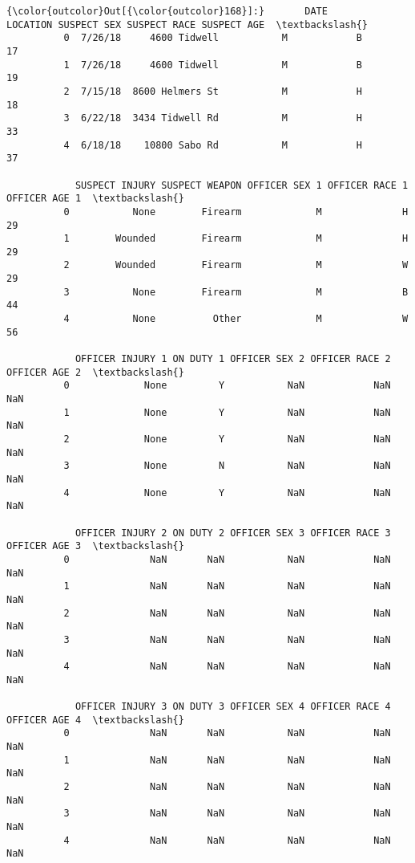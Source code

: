 \documentclass[11pt]{article}
\begin{document}
\begin{Verbatim}[commandchars=\\\{\}]
{\color{outcolor}Out[{\color{outcolor}168}]:}       DATE         LOCATION SUSPECT SEX SUSPECT RACE SUSPECT AGE  \textbackslash{}
          0  7/26/18     4600 Tidwell           M            B          17   
          1  7/26/18     4600 Tidwell           M            B          19   
          2  7/15/18  8600 Helmers St           M            H          18   
          3  6/22/18  3434 Tidwell Rd           M            H          33   
          4  6/18/18    10800 Sabo Rd           M            H          37   
          
            SUSPECT INJURY SUSPECT WEAPON OFFICER SEX 1 OFFICER RACE 1  OFFICER AGE 1  \textbackslash{}
          0           None        Firearm             M              H             29   
          1        Wounded        Firearm             M              H             29   
          2        Wounded        Firearm             M              W             29   
          3           None        Firearm             M              B             44   
          4           None          Other             M              W             56   
          
            OFFICER INJURY 1 ON DUTY 1 OFFICER SEX 2 OFFICER RACE 2  OFFICER AGE 2  \textbackslash{}
          0             None         Y           NaN            NaN            NaN   
          1             None         Y           NaN            NaN            NaN   
          2             None         Y           NaN            NaN            NaN   
          3             None         N           NaN            NaN            NaN   
          4             None         Y           NaN            NaN            NaN   
          
            OFFICER INJURY 2 ON DUTY 2 OFFICER SEX 3 OFFICER RACE 3  OFFICER AGE 3  \textbackslash{}
          0              NaN       NaN           NaN            NaN            NaN   
          1              NaN       NaN           NaN            NaN            NaN   
          2              NaN       NaN           NaN            NaN            NaN   
          3              NaN       NaN           NaN            NaN            NaN   
          4              NaN       NaN           NaN            NaN            NaN   
          
            OFFICER INJURY 3 ON DUTY 3 OFFICER SEX 4 OFFICER RACE 4  OFFICER AGE 4  \textbackslash{}
          0              NaN       NaN           NaN            NaN            NaN   
          1              NaN       NaN           NaN            NaN            NaN   
          2              NaN       NaN           NaN            NaN            NaN   
          3              NaN       NaN           NaN            NaN            NaN   
          4              NaN       NaN           NaN            NaN            NaN   
          

\end{Verbatim}
\end{document}
